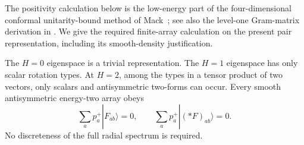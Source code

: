 The positivity calculation below is the low-energy part of the
four-dimensional conformal unitarity-bound method of
Mack~\cite{Mack1977}; see also the level-one Gram-matrix derivation
in \cite[Section~2.5]{Minwalla1998}.  We give the required finite-array
calculation on the present pair representation, including its
smooth-density justification.

\begin{lemma}
\label{P:radial-low-energy}
The $H=0$ eigenspace is a trivial representation.  The $H=1$ eigenspace
has only scalar rotation types.  At $H=2$, among the types in a tensor
product of two vectors, only scalars and antisymmetric two-forms can
occur.  Every smooth antisymmetric energy-two array obeys
\begin{equation}
 \sum_a p_a^+|F_{ab}\rangle=0,\qquad
 \sum_a p_a^+|(*F)_{ab}\rangle=0.
 \label{P:Maxwell-null-vectors}
\end{equation}
No discreteness of the full radial spectrum is required.
\end{lemma}

